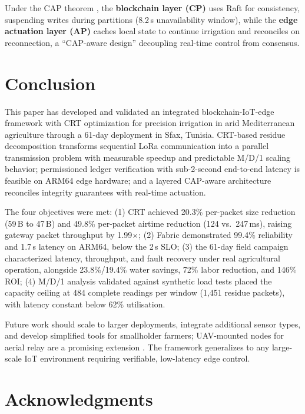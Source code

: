 \documentclass[pdflatex,sn-mathphys-num]{sn-jnl}
\theoremstyle{thmstyleone}
\theoremstyle{thmstyletwo}
\theoremstyle{thmstylethree}
\begin{document}
Under the CAP theorem \cite{brewer2000towards, gilbert2002brewer}, the \textbf{blockchain layer (CP)} uses Raft for consistency, suspending writes during partitions (8.2\,s unavailability window), while the \textbf{edge actuation layer (AP)} caches local state to continue irrigation and reconciles on reconnection, a “CAP-aware design” \cite{pritchett2008base} decoupling real-time control from consensus.

\section{Conclusion}
\label{sec:conclusion}

This paper has developed and validated an integrated blockchain-IoT-edge framework with CRT optimization for precision irrigation in arid Mediterranean agriculture through a 61-day deployment in Sfax, Tunisia. CRT-based residue decomposition transforms sequential LoRa communication into a parallel transmission problem with measurable speedup and predictable M/D/1 scaling behavior; permissioned ledger verification with sub-2-second end-to-end latency is feasible on ARM64 edge hardware; and a layered CAP-aware architecture reconciles integrity guarantees with real-time actuation.

The four objectives were met: (1) CRT achieved 20.3\% per-packet size reduction (59\,B to 47\,B) and 49.8\% per-packet airtime reduction (124 vs.\ 247\,ms), raising gateway packet throughput by 1.99$\times$; (2) Fabric demonstrated 99.4\% reliability and 1.7\,s latency on ARM64, below the 2\,s SLO; (3) the 61-day field campaign characterized latency, throughput, and fault recovery under real agricultural operation, alongside 23.8\%/19.4\% water savings, 72\% labor reduction, and 146\% ROI; (4) M/D/1 analysis validated against synthetic load tests placed the capacity ceiling at 484 complete readings per window (1,451 residue packets), with latency constant below 62\% utilisation.

Future work should scale to larger deployments, integrate additional sensor types, and develop simplified tools for smallholder farmers; UAV-mounted nodes for aerial relay are a promising extension \cite{secure2024drone}. The framework generalizes to any large-scale IoT environment requiring verifiable, low-latency edge control.

\section*{Acknowledgments}
\end{document}
